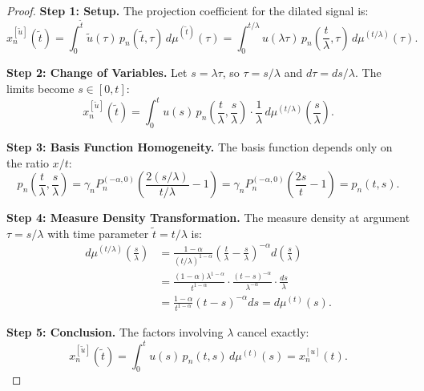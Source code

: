 \documentclass{article}
\theoremstyle{plain}
\theoremstyle{definition}
\theoremstyle{remark}
\begin{document}
\begin{proof}
	\textbf{Step 1: Setup.}
	The projection coefficient for the dilated signal is:
	\begin{equation}
		x_n^{[\tilde{u}]}(\tilde{t}) = \int_0^{\tilde{t}} \tilde{u}(\tau) \, p_n(\tilde{t}, \tau) \, d\mu^{(\tilde{t})}(\tau) = \int_0^{t/\lambda} u(\lambda\tau) \, p_n\left(\frac{t}{\lambda}, \tau\right) \, d\mu^{(t/\lambda)}(\tau).
	\end{equation}
	
	\textbf{Step 2: Change of Variables.}
	Let $s = \lambda\tau$, so $\tau = s/\lambda$ and $d\tau = ds/\lambda$. The limits become $s \in [0, t]$:
	\begin{equation}
		x_n^{[\tilde{u}]}(\tilde{t}) = \int_0^{t} u(s) \, p_n\left(\frac{t}{\lambda}, \frac{s}{\lambda}\right) \cdot \frac{1}{\lambda} \, d\mu^{(t/\lambda)}\left(\frac{s}{\lambda}\right).
	\end{equation}
	
	\textbf{Step 3: Basis Function Homogeneity.}
	The basis function depends only on the ratio $x/t$:
	\begin{equation}
		p_n\left(\frac{t}{\lambda}, \frac{s}{\lambda}\right) = \gamma_n P_n^{(-\alpha, 0)}\left(\frac{2(s/\lambda)}{t/\lambda} - 1\right) = \gamma_n P_n^{(-\alpha, 0)}\left(\frac{2s}{t} - 1\right) = p_n(t, s).
	\end{equation}
	
	\textbf{Step 4: Measure Density Transformation.}
	The measure density at argument $\tau = s/\lambda$ with time parameter $\tilde{t} = t/\lambda$ is:
	\begin{align}
		d\mu^{(t/\lambda)}\left(\frac{s}{\lambda}\right) &= \frac{1-\alpha}{(t/\lambda)^{1-\alpha}} \left(\frac{t}{\lambda} - \frac{s}{\lambda}\right)^{-\alpha} d\left(\frac{s}{\lambda}\right) \\
		&= \frac{(1-\alpha)\lambda^{1-\alpha}}{t^{1-\alpha}} \cdot \frac{(t - s)^{-\alpha}}{\lambda^{-\alpha}} \cdot \frac{ds}{\lambda} \\
		&= \frac{1-\alpha}{t^{1-\alpha}} (t - s)^{-\alpha} ds = d\mu^{(t)}(s).
	\end{align}
	
	\textbf{Step 5: Conclusion.}
	The factors involving $\lambda$ cancel exactly:
	\begin{equation}
		x_n^{[\tilde{u}]}(\tilde{t}) = \int_0^{t} u(s) \, p_n(t, s) \, d\mu^{(t)}(s) = x_n^{[u]}(t).
	\end{equation}
\end{proof}
\end{document}
